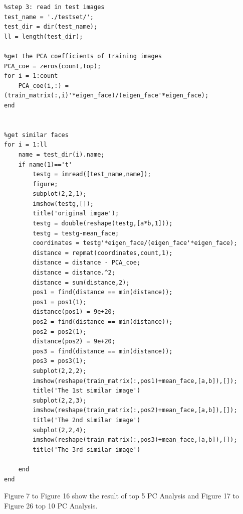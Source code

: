\documentclass{article}
\begin{document}
\begin{lstlisting}
%step 3: read in test images
test_name = './testset/';
test_dir = dir(test_name);
ll = length(test_dir);

%get the PCA coefficients of training images
PCA_coe = zeros(count,top);
for i = 1:count
    PCA_coe(i,:) = (train_matrix(:,i)'*eigen_face)/(eigen_face'*eigen_face);
end


%get similar faces
for i = 1:ll
    name = test_dir(i).name;
    if name(1)=='t'
        testg = imread([test_name,name]);
        figure;
        subplot(2,2,1);
        imshow(testg,[]);
        title('original imgae');
        testg = double(reshape(testg,[a*b,1]));
        testg = testg-mean_face;
        coordinates = testg'*eigen_face/(eigen_face'*eigen_face);
        distance = repmat(coordinates,count,1);
        distance = distance - PCA_coe;
        distance = distance.^2;
        distance = sum(distance,2);
        pos1 = find(distance == min(distance));
        pos1 = pos1(1);
        distance(pos1) = 9e+20;
        pos2 = find(distance == min(distance));
        pos2 = pos2(1);
        distance(pos2) = 9e+20;
        pos3 = find(distance == min(distance));
        pos3 = pos3(1);
        subplot(2,2,2);
        imshow(reshape(train_matrix(:,pos1)+mean_face,[a,b]),[]);
        title('The 1st similar image')
        subplot(2,2,3);
        imshow(reshape(train_matrix(:,pos2)+mean_face,[a,b]),[]);
        title('The 2nd similar image')
        subplot(2,2,4);
        imshow(reshape(train_matrix(:,pos3)+mean_face,[a,b]),[]);
        title('The 3rd similar image')
        
    end
end
\end{lstlisting}

Figure 7 to Figure 16 show the result of top 5 PC Analysis and Figure 17 to Figure 26 top 10 PC Analysis.
\end{document}
